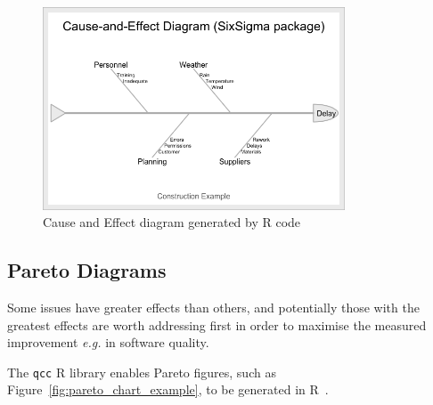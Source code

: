 \begin{figure}[htbp!]
    \centering
    \includegraphics[width=0.8\textwidth]{images/cause-effect-diagram.png}
    \caption{Cause and Effect diagram generated by R code}
    \label{fig:ishikawa-example-in-R}
\end{figure}

\hypertarget{pareto.diagrams.in.r}{}
\subsection{Pareto Diagrams}
Some issues have greater effects than others, and potentially those with the greatest effects are worth addressing first in order to maximise the measured improvement \emph{e.g.} in software quality.

The \texttt{qcc} R library enables Pareto figures, such as Figure~\ref{fig:pareto_chart_example}, to be generated in R~\cite{7_basic_quality_tools_with_R}. 

